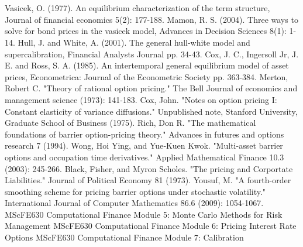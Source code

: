 \documentclass[11pt]{article}
\begin{document}
\newpage
\section*{} \label{bibsection}


\begin{thebibliography}{MMMMM}
 Vasicek, O. (1977). An equilibrium characterization of the term structure, Journal of financial economics 5(2): 177-188.
 Mamon, R. S. (2004). Three ways to solve for bond prices in the vasicek model, Advances in Decision Sciences 8(1): 1-14.
 Hull, J. and White, A. (2001). The general hull-white model and supercalibration, Financial Analysts Journal pp. 34-43.
 Cox, J. C., Ingersoll Jr, J. E. and Ross, S. A. (1985). An intertemporal general equilibrium model of asset prices, Econometrica: Journal of the Econometric Society pp. 363-384.
 Merton, Robert C. "Theory of rational option pricing." The Bell Journal of economics and management science (1973): 141-183.
  Cox, John. "Notes on option pricing I: Constant elasticity of variance diffusions." Unpublished note, Stanford University, Graduate School of Business (1975).
 Rich, Don R. "The mathematical foundations of barrier option-pricing theory." Advances in futures and options research 7 (1994).
 Wong, Hoi Ying, and Yue‐Kuen Kwok. "Multi-asset barrier options and occupation time derivatives." Applied Mathematical Finance 10.3 (2003): 245-266.
Black, Fisher, and Myron Scholes. "The pricing and Corportate Liabilities." Journal of Political Economy 81 (1973).
 Yousuf, M. "A fourth-order smoothing scheme for pricing barrier options under stochastic volatility." International Journal of Computer Mathematics 86.6 (2009): 1054-1067.
 MScFE630 Computational Finance Module 5: Monte Carlo Methods for Risk Management
 MScFE630 Computational Finance Module 6: Pricing Interest Rate Options
 MScFE630 Computational Finance Module 7: Calibration

\end{thebibliography}
\end{document}
